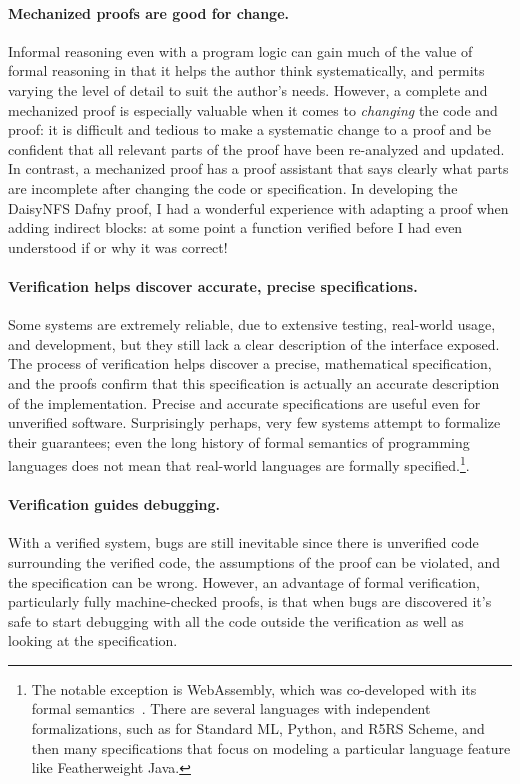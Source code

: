 \paragraph{Mechanized proofs are good for change.} Informal
reasoning even with a program logic can gain much of the value of formal
reasoning in that it helps the author think systematically, and permits varying
the level of detail to suit the author's needs. However, a complete and
mechanized proof is especially valuable when it comes to \emph{changing} the
code and proof: it is difficult and tedious to make a systematic change to a
proof and be confident that all relevant parts of the proof have been
re-analyzed and updated. In contrast, a mechanized proof has a proof assistant
that says clearly what parts are incomplete after changing the code or
specification. In developing the DaisyNFS Dafny proof, I had a wonderful
experience with adapting a proof when adding indirect blocks: at some point a
function verified before I had even understood if or why it was correct!

\paragraph{Verification helps discover accurate, precise specifications.} Some
systems are extremely reliable, due to extensive testing, real-world usage, and
development, but they still lack a clear description of the interface exposed.
The process of verification helps discover a precise, mathematical
specification, and the proofs confirm that this specification is actually an
accurate description of the implementation. Precise and accurate specifications
are useful even for unverified software. Surprisingly perhaps, very few systems
attempt to formalize their guarantees; even the long history of formal semantics
of programming languages does not mean that real-world languages are formally
specified.\footnote{The notable exception is WebAssembly, which was co-developed
with its formal semantics~\cite{haas:wasm}. There are several languages with
independent formalizations, such as for Standard ML, Python, and R5RS Scheme,
and then many specifications that focus on modeling a particular language
feature like Featherweight Java. }.

\paragraph{Verification guides debugging.} With a verified system, bugs are
still inevitable since there is unverified code surrounding the verified code,
the assumptions of the proof can be violated, and the specification can be
wrong. However, an advantage of formal verification, particularly fully
machine-checked proofs, is that when bugs are discovered it's safe to start
debugging with all the code outside the verification as well as looking at the
specification.

